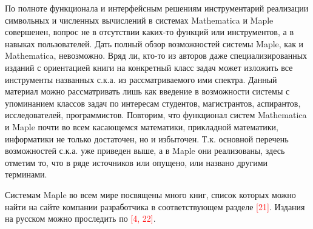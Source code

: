 По полноте функционала и интерфейсным решениям инструментарий реализации символьных и численных вычислений в системах Mathematica и Maple совершенен, вопрос не в отсутствии каких-то функций или инструментов, а в навыках пользователей.
Дать полный обзор возможностей системы Maple, как и Mathematica, невозможно. Вряд ли, кто-то из авторов даже специализированных изданий с ориентацией книги на конкретный класс задач может изложить все инструменты названных с.к.а. из рассматриваемого ими спектра. Данный материал можно рассматривать лишь как введение в возможности системы с упоминанием классов задач по интересам студентов, магистрантов, аспирантов, исследователей, программистов. Повторим, что функционал систем Mathematica и Maple почти во всем касающемся математики, прикладной математики, информатики не только достаточен, но и избыточен. Т.к. основной перечень возможностей с.к.а. уже приведен выше, а в Maple они реализованы, здесь отметим то, что в ряде источников или опущено, или названо другими терминами.

Системам Maple во всем мире посвящены много книг, список которых можно найти на сайте компании разработчика в соответствующем разделе \textcolor{red}{[21]}. 
Издания на русском можно проследить по \textcolor{red}{[4, 22]}. 

